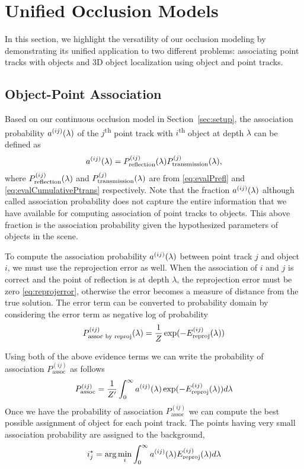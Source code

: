 \section{Unified Occlusion Models}

In this section, we highlight the versatility of our occlusion modeling by demonstrating its unified application to two different problems: associating point tracks with objects and 3D object localization using object and point tracks.

\subsection{Object-Point Association}
Based on our continuous occlusion model in Section~\ref{sec:setup}, the association probability $a^{(ij)}(\lambda)$ of the $j$\textsuperscript{th} point track with $i$\textsuperscript{th} object at depth $\lambda$ can be defined as
\begin{align}
a^{(ij)}(\lambda) = P^{(ij)}_{\text{reflection}}(\lambda)P^{(j)}_{\text{transmission}}(\lambda),
\label{eq:defineassocP}
\end{align}
where $P^{(ij)}_{\text{reflection}}(\lambda)$ and $P^{(j)}_{\text{transmission}}(\lambda)$ are from \eqref{eq:evalPrefl} and \eqref{eq:evalCumulativePtrans} respectively. Note that the fraction $a^{(ij)}(\lambda)$ although called association probability does not capture the entire information that we have available for computing association of point tracks to objects. This above fraction is the association probability given the hypothesized parameters of objects in the scene. 

To compute the association probability $a^{(ij)}(\lambda)$ between point track $j$ and object $i$, we must use the reprojection error as well. When the association of $i$ and $j$ is correct and the point of reflection is at depth $\lambda$, the reprojection error must be zero \eqref{eq:reprojerror}, otherwise the error becomes a measure of distance from the true solution. The error term can be converted to probability domain by considering the error term as negative log of probability
\begin{align}
  P^{(ij)}_{\text{assoc by reproj}}(\lambda) = \frac{1}{Z}\exp(-E^{(ij)}_{\text{reproj}}(\lambda))
\end{align}

Using both of the above evidence terms we can write the probability of association $P^{(ij)}_{\text{assoc}}$ as follows
\begin{align}
  P^{(ij)}_{\text{assoc}} = \frac{1}{Z'}\int_0^{\infty} a^{(ij)}(\lambda) \exp(-E^{(ij)}_{\text{reproj}}(\lambda))d\lambda
  \label{eq:prob-assoc}
\end{align}
Once we have the probability of association $P^{(ij)}_{\text{assoc}}$ we can compute the best possible assignment of object for each point track. The points having very small association probability are assigned to the background,
\begin{align}
  i^*_{j} = \arg \min_{i} \int_0^\infty a^{(ij)}(\lambda) E^{(ij)}_{\text{reproj}}(\lambda) d\lambda
\end{align}


